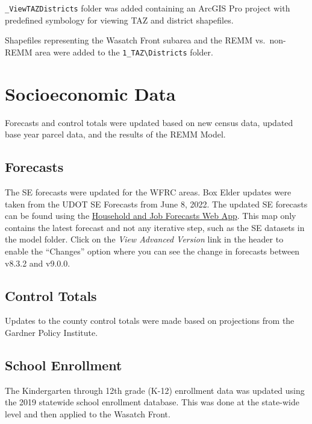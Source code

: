 \documentclass[
  letterpaper,
  DIV=11,
  numbers=noendperiod,
  titlepage=false]{scrreprt}
\begin{document}
\texttt{\_ViewTAZDistricts} folder was added containing an ArcGIS Pro
project with predefined symbology for viewing TAZ and district
shapefiles.

Shapefiles representing the Wasatch Front subarea and the REMM
vs.~non-REMM area were added to the
\texttt{1\_TAZ\textbackslash{}Districts} folder.

\hypertarget{socioeconomic-data}{%
\section{Socioeconomic Data}\label{socioeconomic-data}}

Forecasts and control totals were updated based on new census data,
updated base year parcel data, and the results of the REMM Model.

\hypertarget{forecasts}{%
\subsection{Forecasts}\label{forecasts}}

The SE forecasts were updated for the WFRC areas. Box Elder updates were
taken from the UDOT SE Forecasts from June 8, 2022. The updated SE
forecasts can be found using the
\href{https://wfrc.org/household-job-forecast-map}{Household and Job
Forecasts Web App}. This map only contains the latest forecast and not
any iterative step, such as the SE datasets in the model folder. Click
on the \emph{View Advanced Version} link in the header to enable the
``Changes'' option where you can see the change in forecasts between
v8.3.2 and v9.0.0.

\hypertarget{control-totals}{%
\subsection{Control Totals}\label{control-totals}}

Updates to the county control totals were made based on projections from
the Gardner Policy Institute.

\hypertarget{school-enrollment}{%
\subsection{School Enrollment}\label{school-enrollment}}

The Kindergarten through 12th grade (K-12) enrollment data was updated
using the 2019 statewide school enrollment database. This was done at
the state-wide level and then applied to the Wasatch Front.
\end{document}
